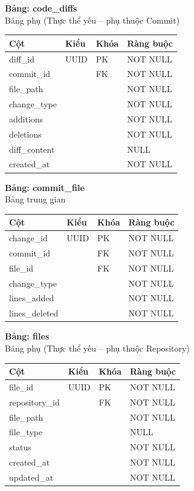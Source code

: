 \textbf{Bảng: code\_diffs}\\
Bảng phụ (Thực thể yếu – phụ thuộc Commit)
\begin{table}[H]
\centering
\begin{tabular}{|l|l|l|l|}
\hline
\textbf{Cột} & \textbf{Kiểu} & \textbf{Khóa} & \textbf{Ràng buộc} \\ \hline
diff\_id & UUID & PK & NOT NULL \\ \hline
commit\_id & & FK & NOT NULL \\ \hline
file\_path & & & NOT NULL \\ \hline
change\_type & & & NOT NULL \\ \hline
additions & & & NOT NULL \\ \hline
deletions & & & NOT NULL \\ \hline
diff\_content & & & NULL \\ \hline
created\_at & & & NOT NULL \\ \hline
\end{tabular}
\end{table}

\textbf{Bảng: commit\_file}\\
Bảng trung gian
\begin{table}[H]
\centering
\begin{tabular}{|l|l|l|l|}
\hline
\textbf{Cột} & \textbf{Kiểu} & \textbf{Khóa} & \textbf{Ràng buộc} \\ \hline
change\_id & UUID & PK & NOT NULL \\ \hline
commit\_id & & FK & NOT NULL \\ \hline
file\_id & & FK & NOT NULL \\ \hline
change\_type & & & NOT NULL \\ \hline
lines\_added & & & NOT NULL \\ \hline
lines\_deleted & & & NOT NULL \\ \hline
\end{tabular}
\end{table}

\textbf{Bảng: files}\\
Bảng phụ (Thực thể yếu – phụ thuộc Repository)
\begin{table}[H]
\centering
\begin{tabular}{|l|l|l|l|}
\hline
\textbf{Cột} & \textbf{Kiểu} & \textbf{Khóa} & \textbf{Ràng buộc} \\ \hline
file\_id & UUID & PK & NOT NULL \\ \hline
repository\_id & & FK & NOT NULL \\ \hline
file\_path & & & NOT NULL \\ \hline
file\_type & & & NULL \\ \hline
status & & & NOT NULL \\ \hline
created\_at & & & NOT NULL \\ \hline
updated\_at & & & NOT NULL \\ \hline
\end{tabular}
\end{table}

